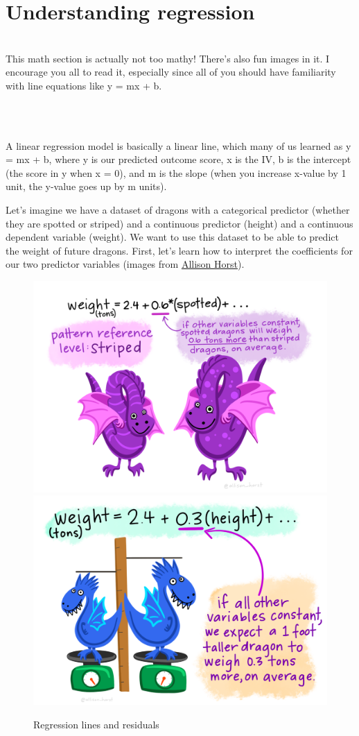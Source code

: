 \documentclass[
]{book}
\newenvironment{info}
    {
    \hline\\
    }
    { 
    \\\\\hline
    }
\begin{document}
\hypertarget{understanding-regression}{%
\section{Understanding regression}\label{understanding-regression}}

\begin{info}
This math section is actually not too mathy! There's also fun images in
it. I encourage you all to read it, especially since all of you should
have familiarity with line equations like y = mx + b.
\end{info}

A linear regression model is basically a linear line, which many of us learned as y = mx + b, where y is our predicted outcome score, x is the IV, b is the intercept (the score in y when x = 0), and m is the slope (when you increase x-value by 1 unit, the y-value goes up by m units).

Let's imagine we have a dataset of dragons with a categorical predictor (whether they are spotted or striped) and a continuous predictor (height) and a continuous dependent variable (weight). We want to use this dataset to be able to predict the weight of future dragons. First, let's learn how to interpret the coefficients for our two predictor variables (images from \href{https://github.com/allisonhorst/stats-illustrations\#multiple-linear-regression-dragons-thread}{Allison Horst}).

\begin{figure}

{\centering \includegraphics[width=0.49\linewidth]{images/13-regression/dragon_categorical} \includegraphics[width=0.49\linewidth]{images/13-regression/dragons_continuous} 

}

\caption{Regression lines and residuals}\label{fig:unnamed-chunk-2}
\end{figure}
\end{document}
